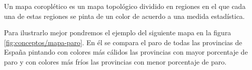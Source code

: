 Un mapa coroplético\cite{wiki:mapascoropleticos} es un mapa topológico dividido en regiones en el que cada una de estas regiones se pinta de un color de acuerdo a una medida estadística.

Para ilustrarlo mejor pondremos el ejemplo del siguiente mapa en la figura \ref{fig:conceptos/mapa-paro}. En él se compara el paro de todas las provincias de España pintando con colores más cálidos las provincias con mayor porcentaje de paro y con colores más fríos las provincias con menor porcentaje de paro.


